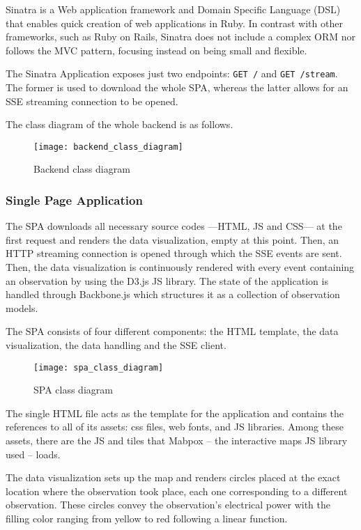 Sinatra is a Web application framework and Domain Specific Language (DSL) that enables quick creation of web applications in Ruby. In contrast with other frameworks, such as Ruby on Rails, Sinatra does not include a complex ORM nor follows the MVC pattern, focusing instead on being small and flexible.

The Sinatra Application exposes just two endpoints: \texttt{GET /} and \texttt{GET /stream}. The former is used to download the whole SPA, whereas the latter allows for an SSE streaming connection to be opened.

The class diagram of the whole backend is as follows.

\begin{figure}[h]
	\centering
	\texttt{[image: backend\_class\_diagram]}
	\caption{Backend class diagram}
	\label{fig:backend_class_diagram}
\end{figure}

\subsubsection{Single Page Application}

The SPA downloads all necessary source codes ---HTML, JS and CSS--- at the first request and renders the data visualization, empty at this point. Then, an HTTP streaming connection is opened  through which the SSE events are sent. Then, the data visualization is continuously rendered with every event containing an observation by using the D3.js JS library. The state of the application is handled through Backbone.js which structures it as a collection of observation models.

The SPA consists of four different components: the HTML template, the data visualization, the data handling and the SSE client.

\begin{figure}[h]
	\centering
	\texttt{[image: spa\_class\_diagram]}
	\caption{SPA class diagram}
	\label{fig:spa_class_diagram}
\end{figure}

The single HTML file acts as the template for the application and contains the references to all of its assets: css files, web fonts, and JS libraries. Among these assets, there are the JS and tiles that Mabpox -- the interactive maps JS library used -- loads.

The data visualization sets up the map and renders circles placed at the exact location where the observation took place, each one corresponding to a different observation. These circles convey the observation's electrical power with the filling color ranging from yellow to red following a linear function.

